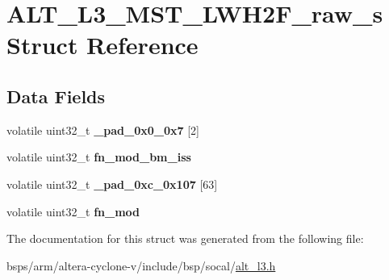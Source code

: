 \hypertarget{structALT__L3__MST__LWH2F__raw__s}{}\section{A\+L\+T\+\_\+\+L3\+\_\+\+M\+S\+T\+\_\+\+L\+W\+H2\+F\+\_\+raw\+\_\+s Struct Reference}
\label{structALT__L3__MST__LWH2F__raw__s}
\subsection*{Data Fields}
\begin{DoxyCompactItemize}
\item 
\mbox{\label{structALT__L3__MST__LWH2F__raw__s_a19b1a9295618ad09a654de2dec085c0a}} 
volatile uint32\+\_\+t {\bfseries \+\_\+pad\+\_\+0x0\+\_\+0x7} \mbox{[}2\mbox{]}
\item 
\mbox{\label{structALT__L3__MST__LWH2F__raw__s_a1d3086e1dd7790e2fad3b2310da1b9e0}} 
volatile uint32\+\_\+t {\bfseries fn\+\_\+mod\+\_\+bm\+\_\+iss}
\item 
\mbox{\label{structALT__L3__MST__LWH2F__raw__s_a06c522889f49e5d00fd919227c23216a}} 
volatile uint32\+\_\+t {\bfseries \+\_\+pad\+\_\+0xc\+\_\+0x107} \mbox{[}63\mbox{]}
\item 
\mbox{\label{structALT__L3__MST__LWH2F__raw__s_a29af07b409914174f6171c600dc084dd}} 
volatile uint32\+\_\+t {\bfseries fn\+\_\+mod}
\end{DoxyCompactItemize}


The documentation for this struct was generated from the following file\+:\begin{DoxyCompactItemize}
\item 
bsps/arm/altera-\/cyclone-\/v/include/bsp/socal/\mbox{\hyperlink{alt__l3_8h}{alt\+\_\+l3.\+h}}\end{DoxyCompactItemize}
